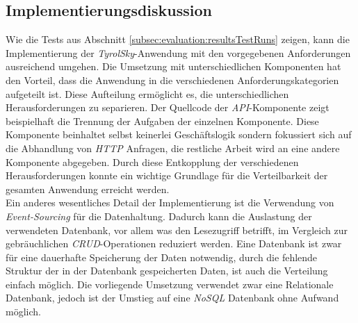 \subsection{Implementierungsdiskussion}
Wie die Tests aus Abschnitt \ref{subsec:evaluation:resultsTestRuns} zeigen, kann die Implementierung der \textit{TyrolSky}-Anwendung mit den vorgegebenen Anforderungen ausreichend umgehen. Die Umsetzung mit unterschiedlichen Komponenten hat den Vorteil, dass die Anwendung  in die verschiedenen Anforderungskategorien aufgeteilt ist. Diese Aufteilung ermöglicht es, die unterschiedlichen Herausforderungen zu separieren. Der Quellcode der \textit{API}-Komponente zeigt beispielhaft die Trennung der Aufgaben der einzelnen Komponente. Diese Komponente beinhaltet selbst keinerlei Geschäftslogik sondern fokussiert sich auf die Abhandlung von \textit{HTTP} Anfragen, die restliche Arbeit wird an eine andere Komponente abgegeben. Durch diese Entkopplung der verschiedenen Herausforderungen konnte ein wichtige Grundlage für die Verteilbarkeit der gesamten Anwendung erreicht werden. \\
% 
% 
Ein anderes wesentliches Detail der Implementierung ist die Verwendung von \textit{Event-Sourcing} für die Datenhaltung. Dadurch kann die Auslastung der verwendeten Datenbank, vor allem was den Lesezugriff betrifft, im Vergleich zur gebräuchlichen \textit{CRUD}-Operationen reduziert werden. 
Eine Datenbank ist zwar für eine dauerhafte Speicherung der Daten notwendig, durch die fehlende Struktur der in der Datenbank gespeicherten Daten, ist auch die Verteilung einfach möglich. Die vorliegende Umsetzung verwendet zwar eine Relationale Datenbank, jedoch ist der Umstieg auf eine \textit{NoSQL} Datenbank ohne Aufwand möglich. \\
